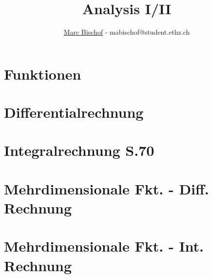 \documentclass[8pt]{mpscheatsheet}
\author{\href{https://n.ethz.ch/\~mabischof}{Marc Bischof} - mabischof@student.ethz.ch}
\title{Analysis I/II}
\begin{document}
     \section{Funktionen}
        
        
        
        
    \cbreak
    \section{Differentialrechnung}
        
        
    \cbreak
    \section{Integralrechnung \texorpdfstring{\hfill S.70}{S.70}}
        
        
        
    \cbreak
    \section{Mehrdimensionale Fkt. - Diff. Rechnung}
        
        
        
        
        
        
        
        
        
    \cbreak
    \section{Mehrdimensionale Fkt. - Int. Rechnung}
        
        
        
        
        
    \cbreak
        
        
        
        
    \cbreak 
        
        
    \cbreak
\end{document}
